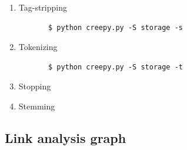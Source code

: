 \documentclass[letterpaper,11pt,twoside]{article}
\begin{document}
\begin{enumerate}
	
	\item Tag-stripping
	\begin{verbatim} 
	   $ python creepy.py -S storage -s 
	\end{verbatim}
	
	\item Tokenizing
	\begin{verbatim} 
	   $ python creepy.py -S storage -t 
	\end{verbatim}
	
	\item Stopping
	
	\item Stemming
	
\end{enumerate}

\subsection{Link analysis graph}
\end{document}
